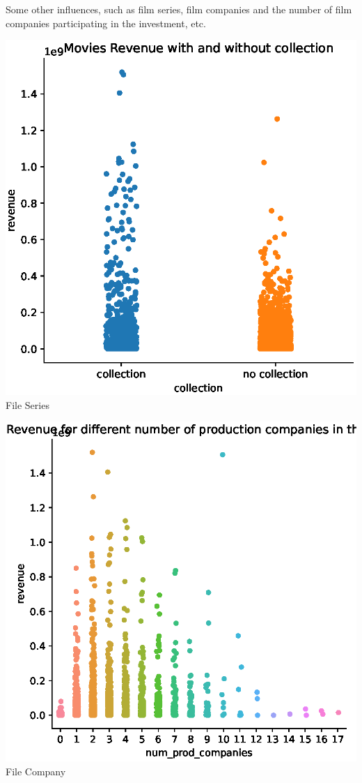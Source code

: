 Some other influences, such as film series, film companies and the number of film companies participating in the investment, etc.
\begin{center}
  \begin{minipage}{0.3\linewidth}
  \centering
    \includegraphics[width=0.8\linewidth]{figures//collection.eps}
  {\small{File Series}}
  \end{minipage}
  \hfill
  \begin{minipage}{0.3\linewidth}
  \centering
    \includegraphics[width=0.8\linewidth]{figures//company.eps}
  {\small{File Company}}
  \end{minipage}

\end{center}
